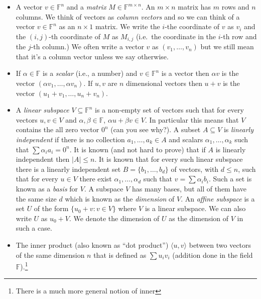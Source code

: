 \begin{itemize}
\item
  A vector \(v \in \mathbb{F}^n\) and a \emph{matrix}
  \(M \in \mathbb{F}^{m \times n}\). An \(m\times n\) matrix has \(m\)
  rows and \(n\) columns. We think of vectors as \emph{column vectors}
  and so we can think of a vector \(v \in \mathbb{F}^n\) as an
  \(n\times 1\) matrix. We write the \(i\)-the coordinate of \(v\) as
  \(v_i\) and the \((i,j)\)-th coordinate of \(M\) as \(M_{i,j}\)
  (i.e.~the coordinate in the \(i\)-th row and the \(j\)-th column.) We
  often write a vector \(v\) as \((v_1,\ldots,v_n)\) but we still mean
  that it's a column vector unless we say otherwise.
\item
  If \(\alpha \in \mathbb{F}\) is a \emph{scalar} (i.e., a number) and
  \(v \in \mathbb{F}^n\) is a vector then \(\alpha v\) is the vector
  \((\alpha v_1 ,\ldots, \alpha v_n)\). If \(u,v\) are \(n\) dimensional
  vectors then \(u+v\) is the vector \((u_1+v_1,\ldots,u_n+v_n)\).
\item
  A \emph{linear subspace} \(V \subseteq \mathbb{F}^n\) is a non-empty
  set of vectors such that for every vectors \(u,v \in V\) and
  \(\alpha,\beta \in \mathbb{F}\), \(\alpha u + \beta v \in V\). In
  particular this means that \(V\) contains the all zero vector \(0^n\)
  (can you see why?). A subset \(A \subseteq V\) is \emph{linearly
  independent} if there is no collection \(a_1,\ldots,a_k \in A\) and
  scalars \(\alpha_1,\ldots,\alpha_k\) such that
  \(\sum \alpha_i a_i = 0^n\). It is known (and not hard to prove) that
  if \(A\) is linearly independent then \(|A| \leq n\). It is known that
  for every such linear subspace there is a linearly independent set
  \(B = \{ b_1,\ldots,b_d \}\) of vectors, with \(d \leq n\), such that
  for every \(u \in V\) there exist \(\alpha_1,\ldots,\alpha_d\) such
  that \(v = \sum \alpha_i b_i\). Such a set is known as a \emph{basis}
  for \(V\). A subspace \(V\) has many bases, but all of them have the
  same size \(d\) which is known as the \emph{dimension} of \(V\). An
  \emph{affine subspace} is a set \(U\) of the form
  \(\{ u_0 + v : v\in V \}\) where \(V\) is a linear subspace. We can
  also write \(U\) as \(u_0 + V\). We denote the dimension of \(U\) as
  the dimension of \(V\) in such a case.
\item
  The inner product (also known as ``dot product'')
  \(\langle u,v \rangle\) between two vectors of the same dimension
  \(n\) that is defined as \(\sum u_i v_i\) (addition done in the field
  \(\mathbb{F}\)).\footnote{There is a much more general notion of inner
}
\end{itemize}
